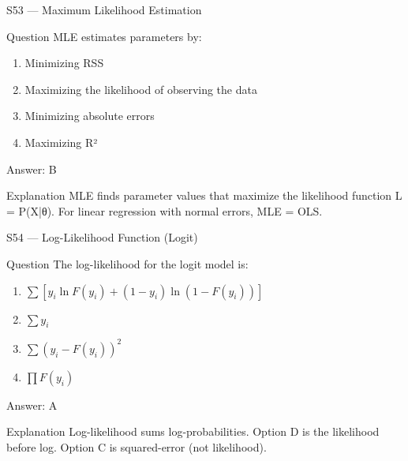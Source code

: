 \documentclass[aspectratio=169,8pt]{beamer}
\begin{document}
	\begin{frame}{S53 --- Maximum Likelihood Estimation}
		\begin{block}{Question}
			MLE estimates parameters by:
			\begin{enumerate}
				\item Minimizing RSS
				\item Maximizing the likelihood of observing the data
				\item Minimizing absolute errors
				\item Maximizing R²
			\end{enumerate}
		\end{block}
		\begin{exampleblock}{Answer: B}\end{exampleblock}
		\begin{block}{Explanation}
			MLE finds parameter values that maximize the likelihood function L = P(X|θ). For linear regression with normal errors, MLE = OLS.
		\end{block}
	\end{frame}
	
	\begin{frame}{S54 --- Log-Likelihood Function (Logit)}
		\begin{block}{Question}
			The log-likelihood for the logit model is:
			\begin{enumerate}
				\item $\sum [y_i \ln F(y_i) + (1-y_i)\ln(1-F(y_i))]$
				\item $\sum y_i$
				\item $\sum (y_i - F(y_i))^2$
				\item $\prod F(y_i)$
			\end{enumerate}
		\end{block}
		\begin{exampleblock}{Answer: A}\end{exampleblock}
		\begin{block}{Explanation}
			Log-likelihood sums log-probabilities. Option D is the likelihood before log. Option C is squared-error (not likelihood).
		\end{block}
	\end{frame}
	
\end{document}
